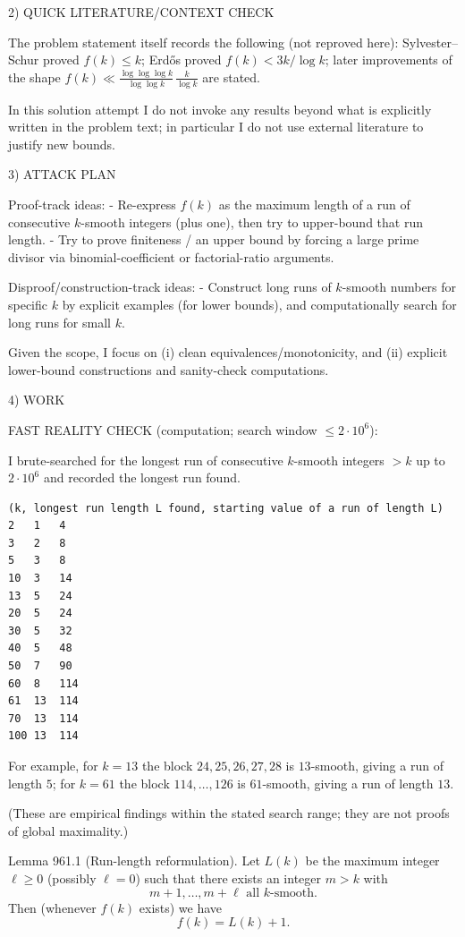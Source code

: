 2) QUICK LITERATURE/CONTEXT CHECK

The problem statement itself records the following (not reproved here): Sylvester--Schur proved $f(k)\le k$; Erd\H{o}s proved $f(k)<3k/\log k$; later improvements of the shape $f(k)\ll \frac{\log\log\log k}{\log\log k}\,\frac{k}{\log k}$ are stated.

In this solution attempt I do not invoke any results beyond what is explicitly written in the problem text; in particular I do not use external literature to justify new bounds.

3) ATTACK PLAN

Proof-track ideas:
- Re-express $f(k)$ as the maximum length of a run of consecutive $k$-smooth integers (plus one), then try to upper-bound that run length.
- Try to prove finiteness / an upper bound by forcing a large prime divisor via binomial-coefficient or factorial-ratio arguments.

Disproof/construction-track ideas:
- Construct long runs of $k$-smooth numbers for specific $k$ by explicit examples (for lower bounds), and computationally search for long runs for small $k$.

Given the scope, I focus on (i) clean equivalences/monotonicity, and (ii) explicit lower-bound constructions and sanity-check computations.

4) WORK

FAST REALITY CHECK (computation; search window $\le 2\cdot 10^6$):

I brute-searched for the longest run of consecutive $k$-smooth integers $>k$ up to $2\cdot 10^6$ and recorded the longest run found.

\begin{verbatim}
(k, longest run length L found, starting value of a run of length L)
2   1   4
3   2   8
5   3   8
10  3   14
13  5   24
20  5   24
30  5   32
40  5   48
50  7   90
60  8   114
61  13  114
70  13  114
100 13  114
\end{verbatim}

For example, for $k=13$ the block $24,25,26,27,28$ is $13$-smooth, giving a run of length $5$; for $k=61$ the block $114,\dots,126$ is $61$-smooth, giving a run of length $13$.

(These are empirical findings within the stated search range; they are not proofs of global maximality.)

Lemma 961.1 (Run-length reformulation).
Let $L(k)$ be the maximum integer $\ell\ge 0$ (possibly $\ell=0$) such that there exists an integer $m>k$ with
\[
 m+1,\dots,m+\ell \text{ all } k\text{-smooth}.
\]
Then (whenever $f(k)$ exists) we have
\[
 f(k)=L(k)+1.
\]

